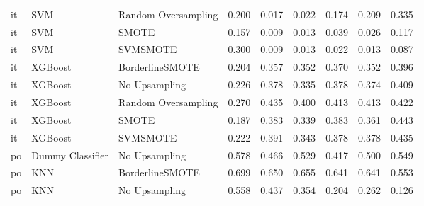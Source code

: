 \begin{tabular}{lllllllll}
      it &                          SVM & Random Oversampling & 0.200 &                     0.017 &                 0.022 &                  0.174 &                                   0.209 &     0.335 \\
      it &                          SVM &               SMOTE & 0.157 &                     0.009 &                 0.013 &                  0.039 &                                   0.026 &     0.117 \\
      it &                          SVM &            SVMSMOTE & 0.300 &                     0.009 &                 0.013 &                  0.022 &                                   0.013 &     0.087 \\
      it &                      XGBoost &     BorderlineSMOTE & 0.204 &                     0.357 &                 0.352 &                  0.370 &                                   0.352 &     0.396 \\
      it &                      XGBoost &       No Upsampling & 0.226 &                     0.378 &                 0.335 &                  0.378 &                                   0.374 &     0.409 \\
      it &                      XGBoost & Random Oversampling & 0.270 &                     0.435 &                 0.400 &                  0.413 &                                   0.413 &     0.422 \\
      it &                      XGBoost &               SMOTE & 0.187 &                     0.383 &                 0.339 &                  0.383 &                                   0.361 &     0.443 \\
      it &                      XGBoost &            SVMSMOTE & 0.222 &                     0.391 &                 0.343 &                  0.378 &                                   0.378 &     0.435 \\
      po &             Dummy Classifier &       No Upsampling & 0.578 &                     0.466 &                 0.529 &                  0.417 &                                   0.500 &     0.549 \\
      po &                          KNN &     BorderlineSMOTE & 0.699 &                     0.650 &                 0.655 &                  0.641 &                                   0.641 &     0.553 \\
      po &                          KNN &       No Upsampling & 0.558 &                     0.437 &                 0.354 &                  0.204 &                                   0.262 &     0.126 \\

\end{tabular}
